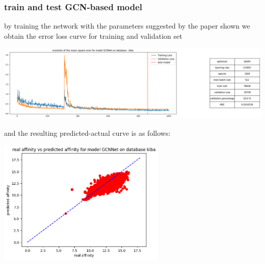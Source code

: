 \documentclass[11pt, a4paper]{article}
\begin{document}
        \subsubsection{train and test GCN-based model}
        by training the network with the parameters suggested by the paper shown we obtain the error loss curve for training and validation set 
        \begin{center}
            \includegraphics[width=1.0\textwidth]{train_test_plots/kiba GCN train.png}
        \end{center}
        and the resulting predicted-actual curve is as follows:
        \begin{center}
            \includegraphics[width=0.6\textwidth]{train_test_plots/kiba GCN test.png}
        \end{center}
\end{document}
